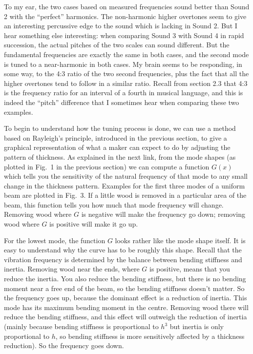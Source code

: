   To my ear, the two cases based on measured frequencies sound better than 
  Sound 2 with the ``perfect'' harmonics. The non-harmonic higher overtones 
  seem to give an interesting percussive edge to the sound which is lacking in 
  Sound 2. But I hear something else interesting: when comparing Sound 3 with 
  Sound 4 in rapid succession, the actual pitches of the two scales can sound 
  different. But the fundamental frequencies are exactly the same in both 
  cases, and the second mode is tuned to a near-harmonic in both cases. My 
  brain seems to be responding, in some way, to the 4:3 ratio of the two second 
  frequencies, plus the fact that all the higher overtones tend to follow in a 
  similar ratio. Recall from section 2.3 that 4:3 is the frequency ratio for an 
  interval of a fourth in musical language, and this is indeed the ``pitch'' 
  difference that I sometimes hear when comparing these two examples. 

\audio{}

\audio{}

\audio{}

\audio{}

  To begin to understand how the tuning process is done, we can use a method 
  based on Rayleigh's principle, introduced in the previous section, to give a 
  graphical representation of what a maker can expect to do by adjusting the 
  pattern of thickness. As explained in the next link, from the mode shapes (as 
  plotted in Fig.\ 1 in the previous section) we can compute a function $G(x)$ 
  which tells you the sensitivity of the natural frequency of that mode to any 
  small change in the thickness pattern. Examples for the first three modes of 
  a uniform beam are plotted in Fig.\ 3. If a little wood is removed in a 
  particular area of the beam, this function tells you how much that mode 
  frequency will change. Removing wood where $G$ is negative will make the 
  frequency go down; removing wood where $G$ is positive will make it go up. 


  For the lowest mode, the function $G$ looks rather like the mode shape 
  itself. It is easy to understand why the curve has to be roughly this shape. 
  Recall that the vibration frequency is determined by the balance between 
  bending stiffness and inertia. Removing wood near the ends, where $G$ is 
  positive, means that you reduce the inertia. You also reduce the bending 
  stiffness, but there is no bending moment near a free end of the beam, so the 
  bending stiffness doesn't matter. So the frequency goes up, because the 
  dominant effect is a reduction of inertia. This mode has its maximum bending 
  moment in the centre. Removing wood there will reduce the bending stiffness, 
  and this effect will outweigh the reduction of inertia (mainly because 
  bending stiffness is proportional to $h^3$ but inertia is only proportional 
  to $h$, so bending stiffness is more sensitively affected by a thickness 
  reduction). So the frequency goes down. 

